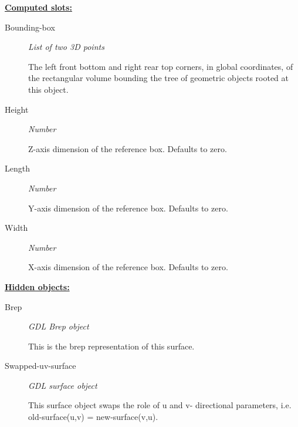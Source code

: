 \documentclass [11pt]{book}
\begin{document}
\begin{itemize}
\begin{description}
\end{description}






\textbf{
\underline{Computed slots:}}

\begin{description}

\item [Bounding-box]
\emph{List of two 3D points}

 The left front bottom and right rear top corners, in global coordinates,
of the rectangular volume bounding the tree of geometric objects rooted at this object.




\item [Height]
\emph{Number}

 Z-axis dimension of the reference box. Defaults to zero.




\item [Length]
\emph{Number}

 Y-axis dimension of the reference box. Defaults to zero.




\item [Width]
\emph{Number}

 X-axis dimension of the reference box. Defaults to zero.




\end{description}






\textbf{
\underline{Hidden objects:}}

\begin{description}

\item [Brep]
\emph{GDL Brep object}

 This is the brep representation of this surface.




\item [Swapped-uv-surface]
\emph{GDL surface object}

 This surface object swaps the role of u and v- directional parameters, i.e. old-surface(u,v) = new-surface(v,u).





\end{description}
\end{itemize}
\end{document}
